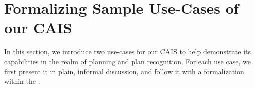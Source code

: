 \section{Formalizing Sample Use-Cases of our CAIS}\label{chap:use_cases}

In this section, we introduce two use-cases for our CAIS to help demonstrate
its capabilities in the realm of planning and plan recognition. For each
use case, we first present it in plain, informal discussion, and follow it
with a formalization within the \CEC.




